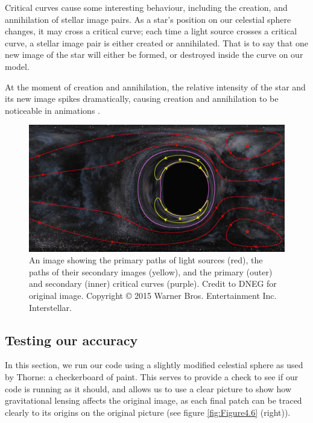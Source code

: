 \documentclass[oneside,openright,frontopenright, singlespacing]{dmathesis}
\begin{document}
\vspace{1em}
	Critical curves cause some interesting behaviour, including the creation, and annihilation of stellar image pairs. As a star's position on our celestial sphere changes, it may cross a critical curve; each time a light source crosses a critical curve, a stellar image pair is either created or annihilated. That is to say that one new image of the star will either be formed, or destroyed inside the curve on our model. 

\vspace{1em}
	At the moment of creation and annihilation, the relative intensity of the star and its new image spikes dramatically, causing creation and annihilation to be noticeable in animations \cite{thorne2015gravitational}.

\begin{figure}[!ht]
	\centering
	\includegraphics[width=0.87\linewidth]{img/caustic}
	\caption{An image showing the primary paths of light sources (red), the paths of their secondary images (yellow), and the primary (outer) and secondary (inner) critical curves (purple). Credit to DNEG for original image\cite{thorne2015gravitational}. Copyright ©  2015 Warner Bros. Entertainment Inc. Interstellar.}
	\label{fig:Figure4.5}
\end{figure}

\subsection{Testing our accuracy}\label{subsec:Subsection4.8.3}

	In this section, we run our code using a slightly modified celestial sphere as used by Thorne\cite{thorne2015gravitational}: a checkerboard of paint. This serves to provide a check to see if our code is running as it should, and allows us to use a clear picture to show how gravitational lensing affects the original image, as each final patch can be traced clearly to its origins on the original picture (see figure \ref{fig:Figure4.6} (right)).
\end{document}
